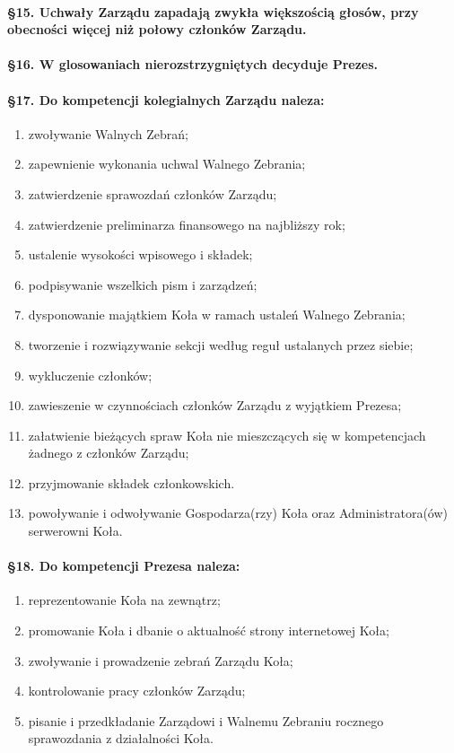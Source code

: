 \documentclass{article}
\begin{document}
		\paragraph{\S 15. Uchwały Zarządu zapadają zwykła większością głosów, przy obecności więcej niż połowy
                           członków Zarządu.}
		\paragraph{\S 16. W glosowaniach nierozstrzygniętych decyduje Prezes.}
		\paragraph{\S 17. Do kompetencji kolegialnych Zarządu naleza:}
		\begin{enumerate}
			\item zwoływanie Walnych Zebrań;
			\item zapewnienie wykonania uchwal Walnego Zebrania;
			\item zatwierdzenie sprawozdań członków Zarządu;
			\item zatwierdzenie preliminarza finansowego na najbliższy rok;
			\item ustalenie wysokości wpisowego i składek;
			\item podpisywanie wszelkich pism i zarządzeń;
			\item dysponowanie majątkiem Koła w ramach ustaleń Walnego Zebrania;
			\item tworzenie i rozwiązywanie sekcji według reguł ustalanych przez siebie;
			\item wykluczenie członków;
			\item zawieszenie w czynnościach członków Zarządu z wyjątkiem Prezesa;
			\item załatwienie bieżących spraw Koła nie mieszczących się w kompetencjach żadnego z członków Zarządu;
			\item przyjmowanie składek członkowskich.
			\item powoływanie i odwoływanie Gospodarza(rzy) Koła oraz Administratora(ów) serwerowni Koła.
		\end{enumerate}
		\paragraph{\S 18. Do kompetencji Prezesa naleza:}
		\begin{enumerate}
			\item reprezentowanie Koła na zewnątrz;
			\item promowanie Koła i dbanie o aktualność strony internetowej Koła;
			\item zwoływanie i prowadzenie zebrań Zarządu Koła;
			\item kontrolowanie pracy członków Zarządu;
			\item pisanie i przedkładanie Zarządowi i Walnemu Zebraniu rocznego sprawozdania z działalności Koła.
		\end{enumerate}
\end{document}
